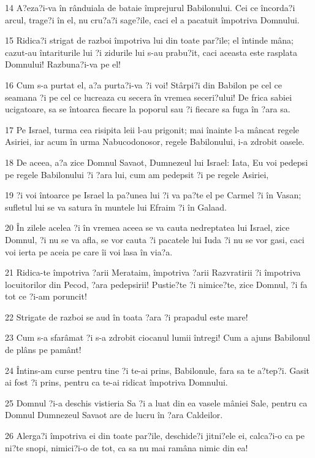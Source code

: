\par 14 A?eza?i-va în rânduiala de bataie împrejurul Babilonului. Cei ce încorda?i arcul, trage?i în el, nu cru?a?i sage?ile, caci el a pacatuit împotriva Domnului.
\par 15 Ridica?i strigat de razboi împotriva lui din toate par?ile; el întinde mâna; cazut-au întariturile lui ?i zidurile lui s-au prabu?it, caci aceasta este rasplata Domnului! Razbuna?i-va pe el!
\par 16 Cum s-a purtat el, a?a purta?i-va ?i voi! Stârpi?i din Babilon pe cel ce seamana ?i pe cel ce lucreaza cu secera în vremea seceri?ului! De frica sabiei ucigatoare, sa se întoarca fiecare la poporul sau ?i fiecare sa fuga în ?ara sa.
\par 17 Pe Israel, turma cea risipita leii l-au prigonit; mai înainte l-a mâncat regele Asiriei, iar acum în urma Nabucodonosor, regele Babilonului, i-a zdrobit oasele.
\par 18 De aceea, a?a zice Domnul Savaot, Dumnezeul lui Israel: Iata, Eu voi pedepsi pe regele Babilonului ?i ?ara lui, cum am pedepsit ?i pe regele Asiriei,
\par 19 ?i voi întoarce pe Israel la pa?unea lui ?i va pa?te el pe Carmel ?i în Vasan; sufletul lui se va satura în muntele lui Efraim ?i în Galaad.
\par 20 În zilele acelea ?i în vremea aceea se va cauta nedreptatea lui Israel, zice Domnul, ?i nu se va afla, se vor cauta ?i pacatele lui Iuda ?i nu se vor gasi, caci voi ierta pe aceia pe care îi voi lasa în via?a.
\par 21 Ridica-te împotriva ?arii Merataim, împotriva ?arii Razvratirii ?i împotriva locuitorilor din Pecod, ?ara pedepsirii! Pustie?te ?i nimice?te, zice Domnul, ?i fa tot ce ?i-am poruncit!
\par 22 Strigate de razboi se aud în toata ?ara ?i prapadul este mare!
\par 23 Cum s-a sfarâmat ?i s-a zdrobit ciocanul lumii întregi! Cum a ajuns Babilonul de plâns pe pamânt!
\par 24 Întins-am curse pentru tine ?i te-ai prins, Babilonule, fara sa te a?tep?i. Gasit ai fost ?i prins, pentru ca te-ai ridicat împotriva Domnului.
\par 25 Domnul ?i-a deschis vistieria Sa ?i a luat din ea vasele mâniei Sale, pentru ca Domnul Dumnezeul Savaot are de lucru în ?ara Caldeilor.
\par 26 Alerga?i împotriva ei din toate par?ile, deschide?i jitni?ele ei, calca?i-o ca pe ni?te snopi, nimici?i-o de tot, ca sa nu mai ramâna nimic din ea!
